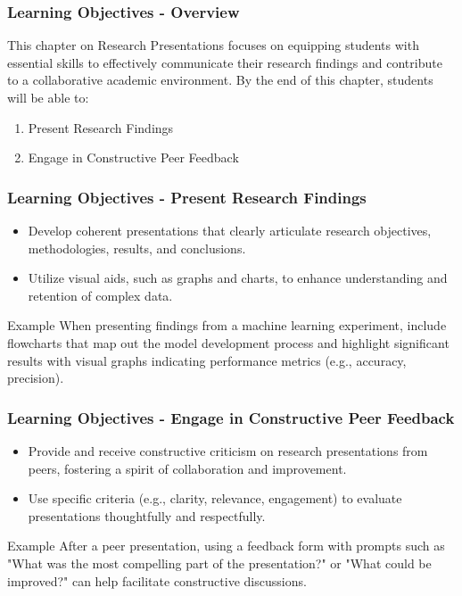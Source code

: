 \documentclass[aspectratio=169]{beamer}
\begin{document}
\begin{frame}[fragile]
    \frametitle{Learning Objectives - Overview}
    This chapter on Research Presentations focuses on equipping students with essential skills to effectively communicate their research findings and contribute to a collaborative academic environment. By the end of this chapter, students will be able to:
    
    \begin{enumerate}
        \item Present Research Findings
        \item Engage in Constructive Peer Feedback
    \end{enumerate}
\end{frame}

\begin{frame}[fragile]
    \frametitle{Learning Objectives - Present Research Findings}
    \begin{itemize}
        \item Develop coherent presentations that clearly articulate research objectives, methodologies, results, and conclusions.
        \item Utilize visual aids, such as graphs and charts, to enhance understanding and retention of complex data.
    \end{itemize}
    
    \begin{block}{Example}
        When presenting findings from a machine learning experiment, include flowcharts that map out the model development process and highlight significant results with visual graphs indicating performance metrics (e.g., accuracy, precision).
    \end{block}
\end{frame}

\begin{frame}[fragile]
    \frametitle{Learning Objectives - Engage in Constructive Peer Feedback}
    \begin{itemize}
        \item Provide and receive constructive criticism on research presentations from peers, fostering a spirit of collaboration and improvement.
        \item Use specific criteria (e.g., clarity, relevance, engagement) to evaluate presentations thoughtfully and respectfully.
    \end{itemize}
    
    \begin{block}{Example}
        After a peer presentation, using a feedback form with prompts such as "What was the most compelling part of the presentation?" or "What could be improved?" can help facilitate constructive discussions.
    \end{block}
\end{frame}
\end{document}
